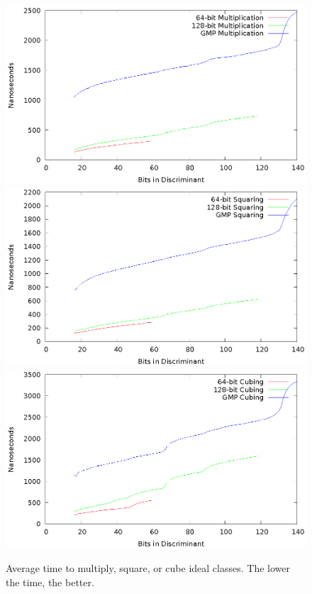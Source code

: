 \documentclass{ucalgthes1}
\theoremstyle{definition}
\begin{document}
\begin{figure}[H]
\centering
\includegraphics[scale=0.9]{compose-all}
\includegraphics[scale=0.9]{square-all}
\includegraphics[scale=0.9]{cube-all}
\caption{Average time to multiply, square, or cube ideal classes. The lower the time, the better.}
\label{fig:idealArithComparison}
\end{figure}
\end{document}
